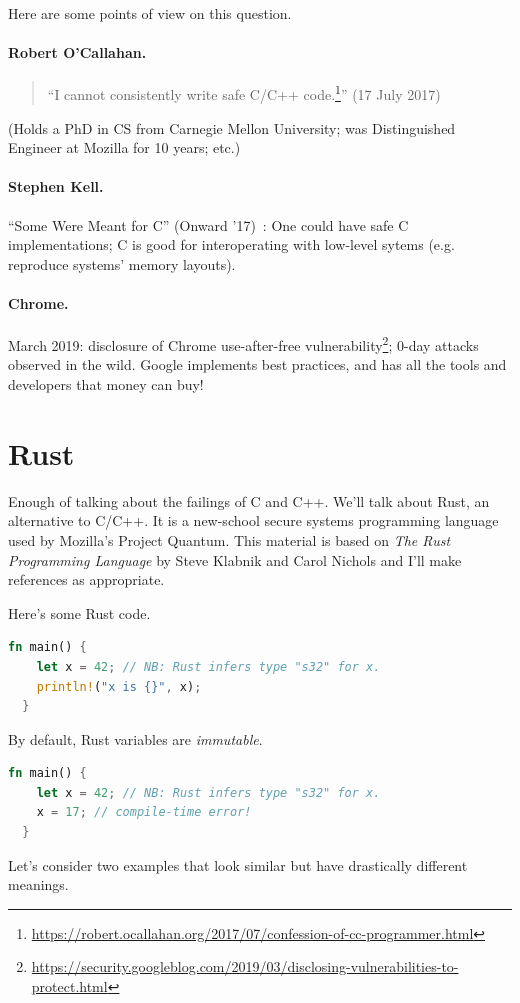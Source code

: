 \documentclass[a4paper]{report}
\begin{document}
Here are some points of view on this question.

\paragraph{Robert O'Callahan.}
\begin{quote}
\vspace*{-1.5em}
``I cannot consistently write safe C/C++ code.\footnote{\url{https://robert.ocallahan.org/2017/07/confession-of-cc-programmer.html}}'' (17 July 2017)
\end{quote}
\vspace*{-1em}
(Holds a PhD in CS from Carnegie Mellon University; was Distinguished Engineer
at Mozilla for 10 years; etc.)

\paragraph{Stephen Kell.} ``Some Were Meant for C'' (Onward '17)~\cite{Kell:2017:MCE:3133850.3133867}: One could have safe C implementations;
C is good for interoperating with low-level sytems (e.g. reproduce systems' memory layouts).

\paragraph{Chrome.} March 2019: disclosure of Chrome use-after-free vulnerability\footnote{\url{https://security.googleblog.com/2019/03/disclosing-vulnerabilities-to-protect.html}}; 0-day attacks
observed in the wild. Google implements best practices, and has all the tools and developers that
money can buy!

\section*{Rust} Enough of talking about the failings of C and C++.
We'll talk about Rust, an alternative to C/C++. It is a new-school
secure systems programming language used by Mozilla's Project Quantum. This material is based
on \emph{The Rust Programming Language} by Steve Klabnik and Carol
Nichols\cite{klabnik18:_rust_progr_languag} and I'll make references as appropriate.

Here's some Rust code.
\vspace*{-.5em}
\begin{lstlisting}[language=Rust]
  fn main() {
    let x = 42; // NB: Rust infers type "s32" for x.
    println!("x is {}", x);
  }
\end{lstlisting}
By default, Rust variables are \emph{immutable}.
\vspace*{-.5em}
\begin{lstlisting}[language=Rust]
  fn main() {
    let x = 42; // NB: Rust infers type "s32" for x.
    x = 17; // compile-time error!
  }
\end{lstlisting}
Let's consider two examples that look similar but have drastically different meanings.
\end{document}
